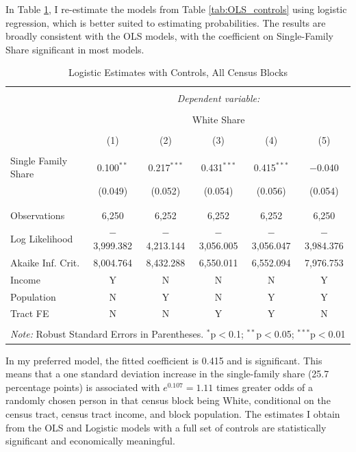 \documentclass[11pt]{article}
\begin{document}
In Table \ref{tab:logit_controls}, I re-estimate the models from Table \ref{tab:OLS_controls} using logistic regression, which is better suited to estimating probabilities. The results are broadly consistent with the OLS models, with the coefficient on Single-Family Share significant in most models.


\begin{table}[!htbp] \centering 
  \caption{Logistic Estimates with Controls, All Census Blocks} 
  \label{tab:logit_controls} 
\begin{tabular}{@{\extracolsep{5pt}}lccccc} 
\\[-1.8ex]\hline 
\hline \\[-1.8ex] 
 & \multicolumn{5}{c}{\textit{Dependent variable:}} \\ 
\cline{2-6} 
\\[-1.8ex] & \multicolumn{5}{c}{White Share} \\ 
\\[-1.8ex] & (1) & (2) & (3) & (4) & (5)\\ 
\hline \\[-1.8ex] 
 Single Family Share & 0.100$^{**}$ & 0.217$^{***}$ & 0.431$^{***}$ & 0.415$^{***}$ & $-$0.040 \\ 
  & (0.049) & (0.052) & (0.054) & (0.056) & (0.054) \\ 
  & & & & & \\ 
\hline \\[-1.8ex] 
Observations & 6,250 & 6,252 & 6,252 & 6,252 & 6,250 \\ 
Log Likelihood & $-$3,999.382 & $-$4,213.144 & $-$3,056.005 & $-$3,056.047 & $-$3,984.376 \\ 
Akaike Inf. Crit. & 8,004.764 & 8,432.288 & 6,550.011 & 6,552.094 & 7,976.753 \\ 
\hline
Income & Y & N & N & N & Y\\
Population & N & Y & N & Y & Y\\
Tract FE & N & N & Y & Y & N\\
\hline 
\hline \\[-1.8ex] 
\multicolumn{6}{l}{\textit{Note:} Robust Standard Errors in Parentheses. $^{*}$p$<$0.1; $^{**}$p$<$0.05; $^{***}$p$<$0.01} \\ 
\end{tabular} 
\end{table}

In my preferred model, the fitted coefficient is 0.415 and is significant. This means that a one standard deviation increase in the single-family share (25.7 percentage points) is associated with $e^{0.107}=1.11$ times greater odds  of a randomly chosen person in that census block being White, conditional on the census tract, census tract income, and block population. The estimates I obtain from the OLS and Logistic models with a full set of controls are statistically significant and economically meaningful.
\end{document}
